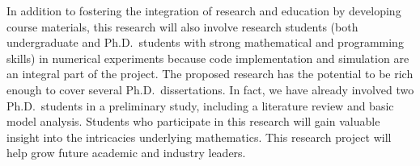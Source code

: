 \documentclass[12pt]{article}
\newcommand{\1}{\mathbf{1}}
\begin{document}
\begin{spacing}{1.32}
In addition to fostering the integration of research and education by developing course materials, this research will also involve research students (both undergraduate and Ph.D.\ students with strong mathematical and programming skills) in numerical experiments because code implementation and simulation are an integral part of the project. 
The proposed research has the potential to be rich enough to cover several Ph.D.\ dissertations. 
In fact, we have already involved two Ph.D.\ students in a preliminary study, including a literature review and basic model analysis. 
Students who participate in this research will gain valuable insight into the intricacies underlying mathematics. This research project will help grow future academic and industry leaders.

\end{spacing}
\end{document}
